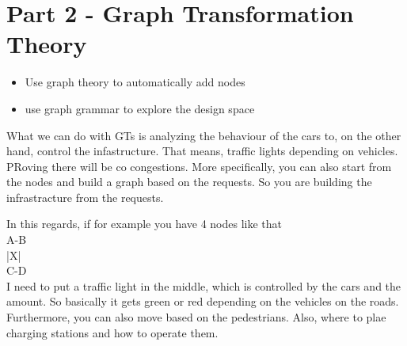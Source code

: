 \chapter{Part 2 - Graph Transformation Theory}
\begin{itemize}
	\item Use graph theory to automatically add nodes
	\item use graph grammar to explore the design space
\end{itemize}
What we can do with GTs is analyzing the behaviour of the cars to, on the other hand, control the infastructure. That means, traffic lights depending on vehicles. PRoving there will be co congestions. More specifically, you can also start from the nodes and build a graph based on the requests. So you are building the infrastracture from the requests. 

In this regards, if for example you have 4 nodes like that \\
A-B\\
|X| \\
C-D\\

I need to put a traffic light in the middle, which is controlled by the cars and the amount. So basically it gets green or red depending on the vehicles on the roads. 
Furthermore, you can also move based on the pedestrians. 
Also, where to plae charging stations and how to operate them. 